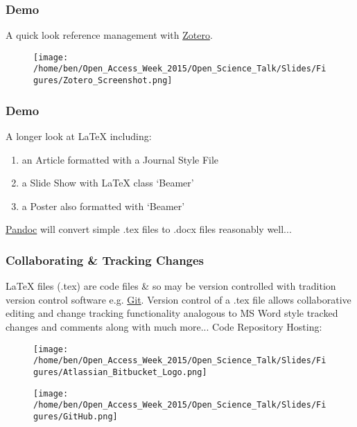 \documentclass[xcolor=dvipsnames]{beamer}
\begin{document}
\begin{frame}
\frametitle{Demo}
A quick look reference management with \href{https://www.zotero.org/}{Zotero}.
\begin{center}
\begin{figure}
\texttt{[image: /home/ben/Open\_Access\_Week\_2015/Open\_Science\_Talk/Slides/Figures/Zotero\_Screenshot.png]}
\end{figure}
\end{center}
\end{frame}

\begin{frame}
\frametitle{Demo}
A longer look at LaTeX including: \begin{enumerate}  
      \item an Article formatted with a Journal Style File
\newline
      \item a Slide Show with LaTeX class `Beamer'
\newline
      \item a Poster also formatted with `Beamer'
\newline
\newline
\end{enumerate}
\href{http://pandoc.org/}{Pandoc} will convert simple .tex files to .docx files reasonably well...
\end{frame}

\begin{frame}
\frametitle{Collaborating \& Tracking Changes}
LaTeX files (.tex) are code files \& so may be version controlled with tradition version control software e.g. \href{https://git-scm.com/}{Git}.
\newline
\newline
Version control of a .tex file allows collaborative editing and change tracking functionality analogous to MS Word style tracked changes and comments along with much more...
\newline
\newline
Code Repository Hosting:
\begin{center}

\begin{figure}
\texttt{[image: /home/ben/Open\_Access\_Week\_2015/Open\_Science\_Talk/Slides/Figures/Atlassian\_Bitbucket\_Logo.png]}
\end{figure}

\begin{figure}
\texttt{[image: /home/ben/Open\_Access\_Week\_2015/Open\_Science\_Talk/Slides/Figures/GitHub.png]}
\end{figure}
\end{center}
\end{frame}
\end{document}
